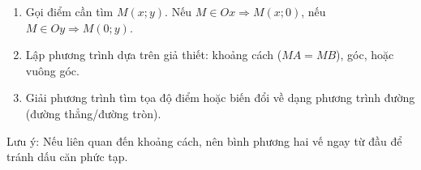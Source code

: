 \begin{enumerate}
\item Gọi điểm cần tìm $M(x; y)$. Nếu $M \in Ox \Rightarrow M(x; 0)$, nếu $M \in Oy \Rightarrow M(0; y)$.
\item Lập phương trình dựa trên giả thiết: khoảng cách ($MA = MB$), góc, hoặc vuông góc.
\item Giải phương trình tìm tọa độ điểm hoặc biến đổi về dạng phương trình đường (đường thẳng/đường tròn).
\end{enumerate}
Lưu ý: Nếu liên quan đến khoảng cách, nên bình phương hai vế ngay từ đầu để tránh dấu căn phức tạp.
